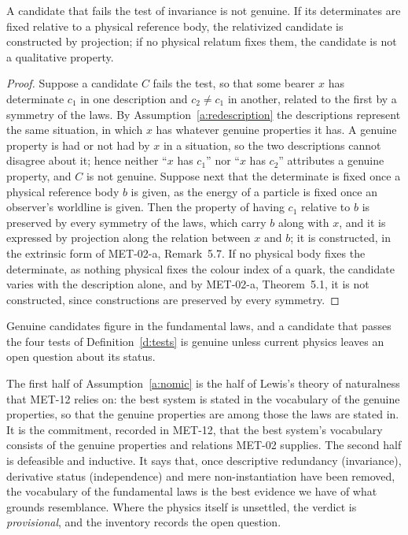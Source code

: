 \documentclass{situationist-preprint}
\begin{document}
\begin{lemma}\label{l:invariance}
A candidate that fails the test of invariance is not genuine. If its determinates are fixed relative to a physical reference body, the relativized candidate is constructed by projection; if no physical relatum fixes them, the candidate is not a qualitative property.
\end{lemma}

\begin{proof}
Suppose a candidate $C$ fails the test, so that some bearer $x$ has determinate $c_1$ in one description and $c_2 \neq c_1$ in another, related to the first by a symmetry of the laws. By Assumption~\ref{a:redescription} the descriptions represent the same situation, in which $x$ has whatever genuine properties it has. A genuine property is had or not had by $x$ in a situation, so the two descriptions cannot disagree about it; hence neither \enquote{$x$ has $c_1$} nor \enquote{$x$ has $c_2$} attributes a genuine property, and $C$ is not genuine. Suppose next that the determinate is fixed once a physical reference body $b$ is given, as the energy of a particle is fixed once an observer's worldline is given. Then the property of having $c_1$ relative to $b$ is preserved by every symmetry of the laws, which carry $b$ along with $x$, and it is expressed by projection along the relation between $x$ and $b$; it is constructed, in the extrinsic form of MET-02-a, Remark~5.7. If no physical body fixes the determinate, as nothing physical fixes the colour index of a quark, the candidate varies with the description alone, and by MET-02-a, Theorem~5.1, it is not constructed, since constructions are preserved by every symmetry.
\end{proof}

\begin{assumption}\label{a:nomic}
Genuine candidates figure in the fundamental laws, and a candidate that passes the four tests of Definition~\ref{d:tests} is genuine unless current physics leaves an open question about its status.
\end{assumption}

The first half of Assumption~\ref{a:nomic} is the half of Lewis's theory of naturalness that MET-12 relies on: the best system is stated in the vocabulary of the genuine properties, so that the genuine properties are among those the laws are stated in. It is the commitment, recorded in MET-12, that the best system's vocabulary consists of the genuine properties and relations MET-02 supplies. The second half is defeasible and inductive. It says that, once descriptive redundancy (invariance), derivative status (independence) and mere non-instantiation have been removed, the vocabulary of the fundamental laws is the best evidence we have of what grounds resemblance. Where the physics itself is unsettled, the verdict is \emph{provisional}, and the inventory records the open question.
\end{document}
